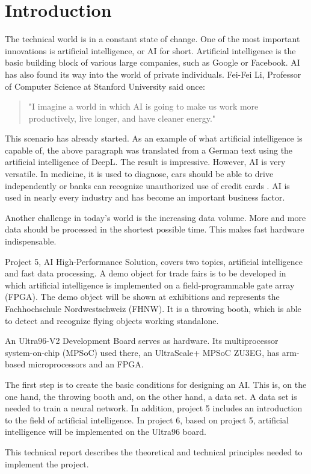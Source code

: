 \section{Introduction}
\label{sec:introduction}
The technical world is in a constant state of change. One of the most important innovations is artificial intelligence, or AI for short.
Artificial intelligence is the basic building block of various large companies, such as Google or Facebook.
AI has also found its way into the world of private individuals.
Fei-Fei Li, Professor of Computer Science at Stanford University said once:
\begin{quote}
	"I imagine a world in which AI is going to make us work more productively, live longer, and have cleaner energy."\cite{quotes_future}
\end{quote}
This scenario has already started. As an example of what artificial intelligence is capable of, the above paragraph was translated from a German text using the artificial intelligence of DeepL. The result is impressive.
However, AI is very versatile. In medicine, it is used to diagnose, cars should be able to drive independently or banks can recognize unauthorized use of credit cards \cite{artificial_intelligence_a_modern_approach}. 
AI is used in nearly every industry and has become an important business factor.

Another challenge in today's world is the increasing data volume. More and more data should be processed in the shortest possible time. This makes fast hardware indispensable.

Project 5, AI High-Performance Solution, covers two topics, artificial intelligence and fast data processing.
A demo object for trade fairs is to be developed in which artificial intelligence is implemented on a field-programmable gate array (FPGA).
The demo object will be shown at exhibitions and represents the Fachhochschule Nordwestschweiz (FHNW).
It is a throwing booth, which is able to detect and recognize flying objects working standalone.

An Ultra96-V2 Development Board serves as hardware.
Its multiprocessor system-on-chip (MPSoC) used there, an UltraScale+ MPSoC ZU3EG, has arm-based microprocessors and an FPGA.

The first step is to create the basic conditions for designing an AI.
This is, on the one hand, the throwing booth and, on the other hand, a data set. A data set is needed to train a neural network.
In addition, project 5 includes an introduction to the field of artificial intelligence.
In project 6, based on project 5, artificial intelligence will be implemented on the Ultra96 board.

This technical report describes the theoretical and technical principles needed to implement the project.